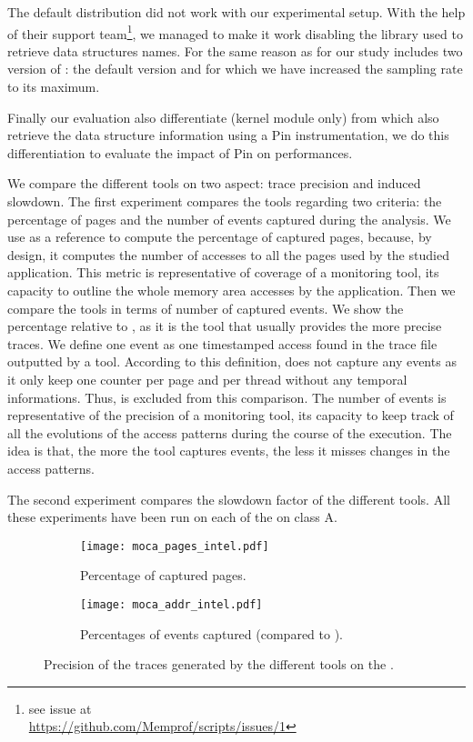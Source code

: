 The default \MemProf distribution did not work with our experimental setup. With the help
of their support team\footnote{see issue at\\\url{https://github.com/Memprof/scripts/issues/1}}, we managed to make it work  disabling the library used to retrieve
data structures names. For the same reason as for \Mitos our study includes
two version of \MemProf: the default version and \MemProfTun for which we have
increased the sampling rate to its maximum.

Finally our evaluation also differentiate \Moca (kernel module only) from
\MocaPin which also retrieve the data structure information using a Pin
instrumentation, we do this differentiation to evaluate the impact of Pin on
\Moca performances.

We compare the different tools on two aspect: trace precision and induced slowdown. The first experiment compares the tools regarding two criteria:  the
percentage of pages and the number of events captured during the analysis.  We use \TABARNAC as a reference to compute the percentage of captured pages,
because, by design, it computes the number of accesses to all the pages used by the studied application. This metric is representative of coverage of a
monitoring tool, its capacity to outline the whole memory area accesses by the application. Then we compare the tools in terms of number of
captured events.  We show the percentage relative to \Moca, as it is the tool that usually provides the more precise traces. We define one event as one
timestamped access found in the trace file outputted by a tool. According to this definition, \TABARNAC does not capture any events as it only keep one
counter per page and per thread without any temporal informations. Thus, \TABARNAC is excluded from this comparison. The number of events is representative
of the precision of a monitoring tool, its capacity to keep track of all the evolutions of the access patterns during the course of the execution. The idea is
that, the more the tool captures events, the less it misses changes in the access patterns.

The second experiment compares the
slowdown factor of the different tools.  All these experiments have been run on each of the \NPB on class A.

\begin{figure}[htb]
    \centering
    \begin{subfigure}{\linewidth}
        \texttt{[image: moca\_pages\_intel.pdf]}
        \caption{Percentage of captured pages.}
        \label{fig:pages}
    \end{subfigure}
    \begin{subfigure}{\linewidth}
        \texttt{[image: moca\_addr\_intel.pdf]}
        \caption{Percentages of events captured (compared to \Moca).}
        \label{fig:addr}
    \end{subfigure}
    \caption{Precision of the traces generated by the different tools on the \NPB.}
    \label{fig:pages-addr}
\end{figure}

